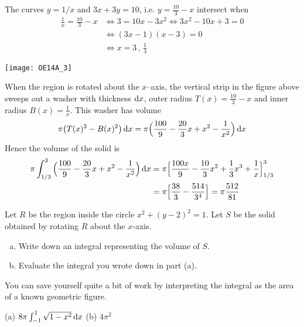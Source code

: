 \begin{solution}

The curves $y=1/x$ and $3x+3y=10$, i.e. $y =\frac{10}{3}-x$ intersect
when
\begin{align*}
\frac{1}{x} = \frac{10}{3}-x
&\iff 3 = 10x-3x^2
\iff 3x^2-10x+3=0 \\
&\iff(3x-1)(x-3)=0 \\
&\iff x=3\,,\,\frac{1}{3}
\end{align*}

\smallskip
\centerline{\texttt{[image: OE14A\_3]}}
\smallskip

\noindent
When the region is rotated about the $x$--axis, the vertical strip
in the figure above sweeps out a washer with thickness $\mathrm{d}x$,
outer radius $T(x)=\frac{10}{3}-x$ and inner radius $B(x)=\frac{1}{x}$.
This washer has volume
\begin{equation*}
\pi\big(T(x)^2- B(x)^2\big)\,\mathrm{d}x
= \pi\Big(\frac{100}{9}-\frac{20}{3}x+x^2-\frac{1}{x^2}\Big)\,\mathrm{d}x
\end{equation*}
Hence the volume of the solid is
\begin{align*}
\pi\int_{1/3}^3\Big(\frac{100}{9}-\frac{20}{3}x+x^2-\frac{1}{x^2}\Big)\,\mathrm{d}x
&=\pi\Big[\frac{100x}{9}-\frac{10}{3}x^2+\frac{1}{3}x^3
              +\frac{1}{x}\Big]_{1/3}^3 \\
&=\pi\Big[\frac{38}{3}-\frac{514}{3^4}\Big] = \pi\frac{512}{81}
\end{align*}
\end{solution}


\begin{question}[2015A] %
 Let $R$ be the region inside the circle $x^2 + (y-2)^2=1$. Let $S$ be the solid obtained by rotating $R$ about the $x$-axis.
\begin{enumerate}[(a)]
\item
 Write down an integral representing the volume of $S$.
\item
Evaluate the integral you wrote down in part (a).
\end{enumerate}
\end{question}

\begin{hint}
You can save yourself quite a bit of work by interpreting the integral
as the  area of a known geometric figure.
\end{hint}

\begin{answer} (a)
$8\pi\int_{-1}^1\sqrt{1-x^2}\,\mathrm{d}x$
\qquad (b)
$ 4\pi^2$
\end{answer}

